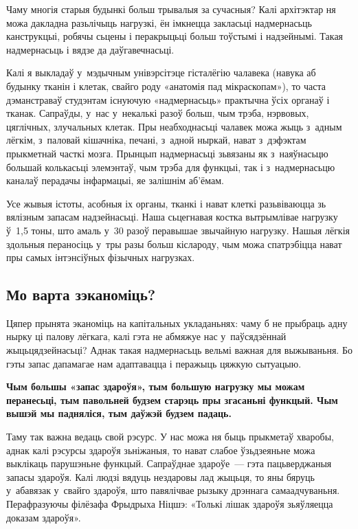Чаму многія старыя будынкі больш трывалыя за сучасныя? Калі архітэктар ня можа дакладна разьлічыць нагрузкі, ён імкнецца закласьці надмернасьць канструкцыі, робячы сьцены і перакрыцьці больш тоўстымі і надзейнымі. Такая надмернасьць і вядзе да даўгавечнасьці.

Калі я выкладаў у~мэдычным унівэрсітэце гісталёгію чалавека (навука аб будынку тканін і клетак, свайго роду «анатомія пад мікраскопам»), то часта дэманстраваў студэнтам існуючую «надмернасьць» практычна ўсіх органаў і тканак. Сапраўды, у~нас у~некалькі разоў больш, чым трэба, нэрвовых, цяглічных, злучальных клетак. Пры неабходнасьці чалавек можа жыць з~адным лёгкім, з~паловай кішачніка, печані, з~адной ныркай, нават з~дэфэктам прыкметнай часткі мозга. Прынцып надмернасьці зьвязаны як з~наяўнасьцю большай колькасьці элемэнтаў, чым трэба для функцыі, так і з~надмернасьцю каналаў перадачы інфармацыі, яе залішнім аб'ёмам.

Усе жывыя істоты, асобныя іх органы, тканкі і нават клеткі разьвіваюцца зь вялізным запасам надзейнасьці. Наша сьцегнавая костка вытрымлівае нагрузку ў~1,5 тоны, што амаль у~30 разоў перавышае звычайную нагрузку. Нашыя лёгкія здольныя пераносіць у~тры разы больш кіслароду, чым можа спатрэбіцца нават пры самых інтэнсіўных фізычных нагрузках.

\subsection*{Мо варта зэканоміць?} 

Цяпер прынята эканоміць на капітальных укладаньнях: чаму б не прыбраць адну нырку ці палову лёгкага, калі гэта не абмяжуе нас у~паўсядзённай жыцьцядзейнасьці? Аднак такая надмернасьць вельмі важная для выжываньня. Бо гэты запас дапамагае нам адаптавацца і перажыць цяжкую сытуацыю. 

\textbf{Чым большы «запас здароўя», тым большую нагрузку мы можам перанесьці, тым павольней будзем старэць пры згасаньні функцый. Чым вышэй мы падняліся, тым даўжэй будзем падаць.}

Таму так важна ведаць свой рэсурс. У нас можа ня быць прыкметаў хваробы, аднак калі рэсурсы здароўя зьніжаныя, то нават слабое ўзьдзеяньне можа выклікаць парушэньне функцый. Сапраўднае здароўе~--- гэта пацьверджаныя запасы здароўя. Калі людзі вядуць нездаровы лад жыцьця, то яны бяруць у~абавязак у~свайго здароўя, што павялічвае рызыку дрэннага самаадчуваньня. Перафразуючы філёзафа Фрыдрыха Ніцшэ: «Толькі лішак здароўя зьяўляецца доказам здароўя».


